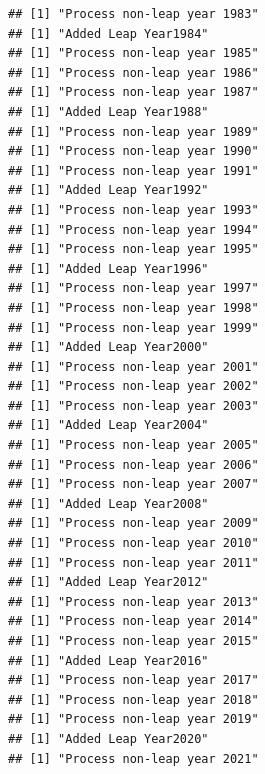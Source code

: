 \documentclass{article}\usepackage[]{graphicx}\usepackage[]{color}
\makeatletter
\newenvironment{kframe}{%
 \def\at@end@of@kframe{}%
 \ifinner\ifhmode%
  \def\at@end@of@kframe{\end{minipage}}%
  \begin{minipage}{\columnwidth}%
 \fi\fi%
 \def\FrameCommand##1{\hskip\@totalleftmargin \hskip-\fboxsep
 \colorbox{shadecolor}{##1}\hskip-\fboxsep
     \hskip-\linewidth \hskip-\@totalleftmargin \hskip\columnwidth}%
 \MakeFramed {\advance\hsize-\width
   \@totalleftmargin\z@ \linewidth\hsize
   \@setminipage}}%
 {\par\unskip\endMakeFramed%
 \at@end@of@kframe}
\newenvironment{knitrout}{}{} %
\makeatother
\begin{document}
\begin{knitrout}
\begin{kframe}
\begin{verbatim}
## [1] "Process non-leap year 1983"
## [1] "Added Leap Year1984"
## [1] "Process non-leap year 1985"
## [1] "Process non-leap year 1986"
## [1] "Process non-leap year 1987"
## [1] "Added Leap Year1988"
## [1] "Process non-leap year 1989"
## [1] "Process non-leap year 1990"
## [1] "Process non-leap year 1991"
## [1] "Added Leap Year1992"
## [1] "Process non-leap year 1993"
## [1] "Process non-leap year 1994"
## [1] "Process non-leap year 1995"
## [1] "Added Leap Year1996"
## [1] "Process non-leap year 1997"
## [1] "Process non-leap year 1998"
## [1] "Process non-leap year 1999"
## [1] "Added Leap Year2000"
## [1] "Process non-leap year 2001"
## [1] "Process non-leap year 2002"
## [1] "Process non-leap year 2003"
## [1] "Added Leap Year2004"
## [1] "Process non-leap year 2005"
## [1] "Process non-leap year 2006"
## [1] "Process non-leap year 2007"
## [1] "Added Leap Year2008"
## [1] "Process non-leap year 2009"
## [1] "Process non-leap year 2010"
## [1] "Process non-leap year 2011"
## [1] "Added Leap Year2012"
## [1] "Process non-leap year 2013"
## [1] "Process non-leap year 2014"
## [1] "Process non-leap year 2015"
## [1] "Added Leap Year2016"
## [1] "Process non-leap year 2017"
## [1] "Process non-leap year 2018"
## [1] "Process non-leap year 2019"
## [1] "Added Leap Year2020"
## [1] "Process non-leap year 2021"
\end{verbatim}



\end{kframe}
\end{knitrout}
\end{document}
